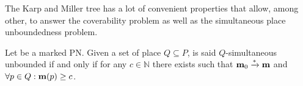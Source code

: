 %
%
%
%
%
%
%
%
%

The Karp and Miller tree has a lot of convenient properties that allow, among other, to answer the coverability problem as well as the simultaneous place unboundedness problem.

\begin{defi}
  Let \NPTm be a marked \ac{PN}.
  Given a set of place $Q \subseteq P$, \N is said $Q$-simultaneous unbounded if and only if for any $c \in \mathbb{N}$ there exists \mar such that $\mathbf{m}_0 \xrightarrow{*} \mathbf{m}$ and $\forall p \in Q : \mathbf{m}(p) \geq c$.
\end{defi}

